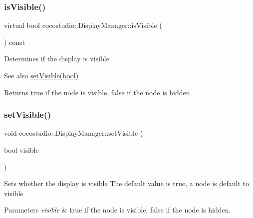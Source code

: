 \subsubsection{\texorpdfstring{is\+Visible()}{isVisible()}\hspace{0.1cm}{\footnotesize\ttfamily [2/2]}}
{\footnotesize\ttfamily virtual bool cocostudio\+::\+Display\+Manager\+::is\+Visible (\begin{DoxyParamCaption}{ }\end{DoxyParamCaption}) const\hspace{0.3cm}{\ttfamily [virtual]}}

Determines if the display is visible

\begin{DoxySeeAlso}{See also}
\hyperlink{classcocostudio_1_1DisplayManager_adc59452ab69d55229d2fce06320379cb}{set\+Visible(bool)} 
\end{DoxySeeAlso}
\begin{DoxyReturn}{Returns}
true if the node is visible, false if the node is hidden. 
\end{DoxyReturn}
\mbox{\label{classcocostudio_1_1DisplayManager_adc59452ab69d55229d2fce06320379cb}} 
\subsubsection{\texorpdfstring{set\+Visible()}{setVisible()}\hspace{0.1cm}{\footnotesize\ttfamily [1/2]}}
{\footnotesize\ttfamily void cocostudio\+::\+Display\+Manager\+::set\+Visible (\begin{DoxyParamCaption}\item[{bool}]{visible }\end{DoxyParamCaption})\hspace{0.3cm}{\ttfamily [virtual]}}

Sets whether the display is visible The default value is true, a node is default to visible


\begin{DoxyParams}{Parameters}
{\em visible} & true if the node is visible, false if the node is hidden. \\
\hline
\end{DoxyParams}
\mbox{\label{classcocostudio_1_1DisplayManager_a60d64761f2b8bde07016fe1803b534bc}} 
